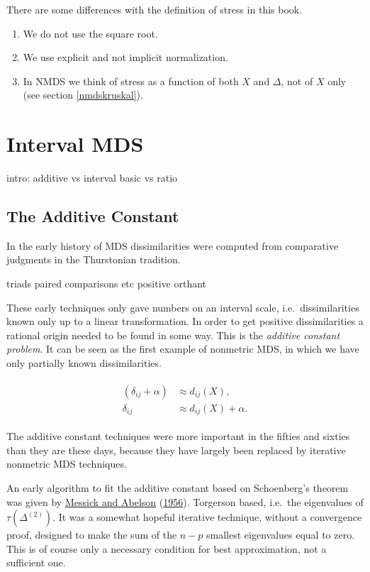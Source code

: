 \documentclass[
  12pt,
]{book}
\providecommand{\tightlist}{%
  \setlength{\itemsep}{0pt}\setlength{\parskip}{0pt}}
\theoremstyle{definition}
\theoremstyle{definition}
\theoremstyle{definition}
\theoremstyle{definition}
\theoremstyle{remark}
\begin{document}
There are some differences with the definition of stress in this book.

\begin{enumerate}
\def\labelenumi{\arabic{enumi}.}
\tightlist
\item
  We do not use the square root.
\item
  We use explicit and not implicit normalization.
\item
  In NMDS we think of stress as a function of both \(X\) and \(\Delta\),
  not of \(X\) only (see section \ref{nmdskruskal}).
\end{enumerate}

\hypertarget{intinterval}{%
\chapter{Interval MDS}\label{intinterval}}

intro: additive vs interval
basic vs ratio

\hypertarget{intadditive}{%
\section{The Additive Constant}\label{intadditive}}

In the early history of MDS dissimilarities were computed from comparative judgments in the
Thurstonian tradition.

triads paired comparisons etc positive orthant

These early techniques only gave numbers on an interval scale, i.e.~dissimilarities known only up to a linear transformation. In order to get positive dissimilarities a rational origin needed to be found in some way. This is the \emph{additive constant problem}. It can be seen as the first example of nonmetric MDS, in which we have only partially known dissimilarities.

\begin{align}
\begin{split}
(\delta_{ij}+\alpha)&\approx d_{ij}(X),\\
\delta_{ij}&\approx d_{ij}(X)+\alpha.
\end{split}
\label{eq:twoadd}
\end{align}

The additive constant techniques were more important in the fifties and sixties than they are these days, because they have largely been replaced by iterative nonmetric MDS techniques.

An early algorithm to fit the additive constant based on Schoenberg's
theorem was given by \protect\hyperlink{ref-messick_abelson_56}{Messick and Abelson} (\protect\hyperlink{ref-messick_abelson_56}{1956}). Torgerson based, i.e.~the eigenvalues of \(\tau(\Delta^{(2)})\). It was a somewhat hopeful iterative technique, without a convergence proof, designed to make the sum of the \(n-p\) smallest eigenvalues equal to zero. This is of course only a necessary condition for best approximation, not a sufficient one.
\end{document}
